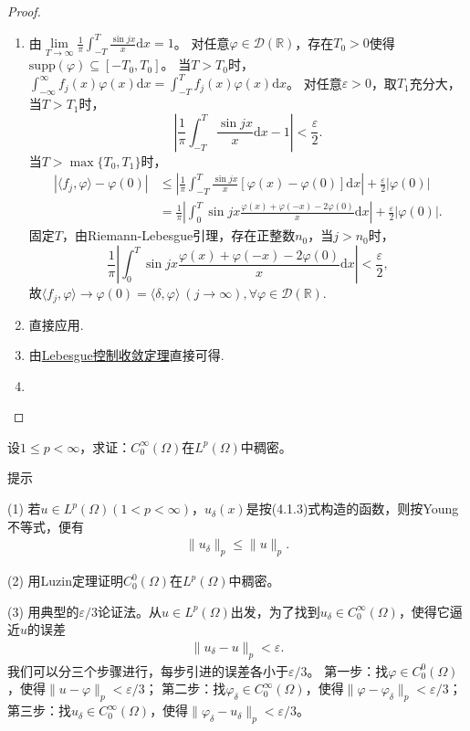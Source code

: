 \documentclass[../../main.tex]{subfiles}%
\begin{document}
\begin{proof}
\begin{enumerate}[(1)]
\item 由$\lim\limits_{T\to\infty}\frac{1}{\pi}\int_{-T}^T\frac{\sin jx}{x}\mathrm{d}x=1$。
对任意$\varphi\in\mathscr{D}(\mathbb{R})$，存在$T_0>0$使得$\mathrm{supp}(\varphi)\subseteq[-T_0,T_0]$。
当$T>T_0$时，$\int_{-\infty}^\infty f_j(x)\varphi(x)\mathrm{d}x=\int_{-T}^T f_j(x)\varphi(x)\mathrm{d}x$。
对任意$\varepsilon>0$，取$T_1$充分大，当$T>T_1$时，
$$\left|\frac{1}{\pi}\int_{-T}^T\frac{\sin jx}{x}\mathrm{d}x-1\right|<\frac{\varepsilon}{2}.$$
当$T>\max\{T_0,T_1\}$时，
\begin{align*}
|\langle f_j,\varphi\rangle-\varphi(0)|&\leqslant\left|\frac{1}{\pi}\int_{-T}^T\frac{\sin jx}{x}[\varphi(x)-\varphi(0)]\mathrm{d}x\right|+\frac{\varepsilon}{2}|\varphi(0)|\\
&=\frac{1}{\pi}\left|\int_{0}^T\sin jx\frac{\varphi(x)+\varphi(-x)-2\varphi(0)}{x}\mathrm{d}x\right|+\frac{\varepsilon}{2}|\varphi(0)|.
\end{align*}
固定$T$，由Riemann-Lebesgue引理，存在正整数$n_0$，当$j>n_0$时，
$$\frac{1}{\pi}\left|\int_{0}^T\sin jx\frac{\varphi(x)+\varphi(-x)-2\varphi(0)}{x}\mathrm{d}x\right|<\frac{\varepsilon}{2},$$
故$\langle f_j,\varphi\rangle\to\varphi(0)=\langle\delta,\varphi\rangle\ (j\to\infty),\forall\varphi\in\mathscr{D}(\mathbb{R})$.

\item 直接应用.

\item 由\hyperref[Real Analysis-theorem:控制收敛定理]{Lebesgue控制收敛定理}直接可得.

\item 
\end{enumerate}
\end{proof}

\begin{example}
设$1\leqslant p<\infty$，求证：$C_0^\infty(\Omega)$在$L^p(\Omega)$中稠密。
\end{example}
\begin{note}
提示

(1) 若$u\in L^p(\Omega)(1<p<\infty)$，$u_\delta(x)$是按(4.1.3)式构造的函数，则按Young不等式，便有
\begin{align*}
\|u_\delta\|_p \leqslant \|u\|_p.
\end{align*}

(2) 用Luzin定理证明$C_0^0(\Omega)$在$L^p(\Omega)$中稠密。

(3) 用典型的$\varepsilon/3$论证法。从$u\in L^p(\Omega)$出发，为了找到$u_\delta\in C_0^\infty(\Omega)$，使得它逼近$u$的误差
\begin{align*}
\|u_\delta - u\|_p < \varepsilon.
\end{align*}
我们可以分三个步骤进行，每步引进的误差各小于$\varepsilon/3$。
第一步：找$\varphi\in C_0^0(\Omega)$，使得$\|u - \varphi\|_p < \varepsilon/3$；
第二步：找$\varphi_\delta\in C_0^\infty(\Omega)$，使得$\|\varphi - \varphi_\delta\|_p < \varepsilon/3$；
第三步：找$u_\delta\in C_0^\infty(\Omega)$，使得$\|\varphi_\delta - u_\delta\|_p < \varepsilon/3$。
\end{note}
\end{document}
